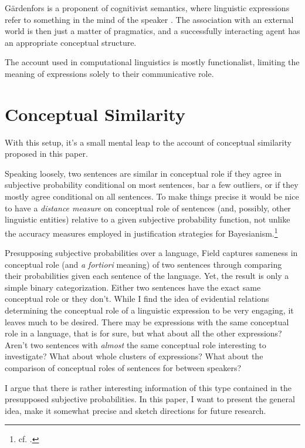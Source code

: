 \documentclass[11pt, a4paper]{scrartcl}
\renewcommand{\i}[1]{\emph{#1}}
\begin{document}
Gärdenfors is a proponent of cognitivist semantics, where linguistic expressions refer to something in the mind of the speaker \parencite[154]{gärdenfors2004conceptual}. The association with an external world is then just a matter of pragmatics, and a successfully interacting agent has an appropriate conceptual structure. 

The account used in computational linguistics is mostly functionalist, limiting the meaning of expressions solely to their communicative role. 
\section{Conceptual Similarity}

With this setup, it's a small mental leap to the account of conceptual similarity proposed in this paper. 

Speaking loosely, two sentences are similar in conceptual role if they agree in subjective probability conditional on most sentences, bar a few outliers, or if they mostly agree conditional on all sentences. To make things precise it would be nice to have a \emph{distance measure} on conceptual role of sentences (and, possibly, other linguistic entities) relative to a given subjective probability function, not unlike the accuracy measures employed in justification strategies for Bayesianism.\footnote{cf. \textcite{Leitgeb2010}.}

Presupposing subjective probabilities over a language, Field captures sameness in conceptual role (and \i{a fortiori} meaning) of two sentences through comparing their probabilities given each sentence of the language. Yet, the result is only a simple binary categorization. Either two sentences have the exact same conceptual role or they don't. While I find the idea of evidential relations determining the conceptual role of a linguistic expression to be very engaging, it leaves much to be desired. There may be expressions with the same conceptual role in a language, that is for sure, but what about all the other expressions? Aren't two sentences with \i{almost} the same conceptual role interesting to investigate? What about whole clusters of expressions? What about the comparison of conceptual roles of sentences for between speakers?

I argue that there is rather interesting information of this type contained in the presupposed subjective probabilities. In this paper, I want to present the general idea, make it somewhat precise and sketch directions for future research.
\end{document}
